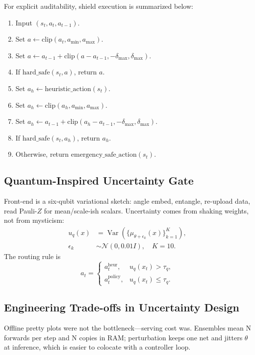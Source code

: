 For explicit auditability, shield execution is summarized below:
\begin{enumerate}
    \item Input $(s_t, a_t, a_{t-1})$.
    \item Set $a\leftarrow\mathrm{clip}(a_t,a_{\min},a_{\max})$.
    \item Set $a\leftarrow a_{t-1}+\mathrm{clip}(a-a_{t-1},-\delta_{\max},\delta_{\max})$.
    \item If $\mathrm{hard\_safe}(s_t,a)$, return $a$.
    \item Set $a_h\leftarrow\mathrm{heuristic\_action}(s_t)$.
    \item Set $a_h\leftarrow\mathrm{clip}(a_h,a_{\min},a_{\max})$.
    \item Set $a_h\leftarrow a_{t-1}+\mathrm{clip}(a_h-a_{t-1},-\delta_{\max},\delta_{\max})$.
    \item If $\mathrm{hard\_safe}(s_t,a_h)$, return $a_h$.
    \item Otherwise, return $\mathrm{emergency\_safe\_action}(s_t)$.
\end{enumerate}

\subsection{Quantum-Inspired Uncertainty Gate}

Front-end is a six-qubit variational sketch: angle embed, entangle, re-upload data, read Pauli-$Z$ for mean/scale-ish scalars. Uncertainty comes from shaking weights, not from mysticism:
\[
\begin{aligned}
u_q(x) &= \operatorname{Var}\left(\{\mu_{\theta+\epsilon_k}(x)\}_{k=1}^{K}\right), \\
\epsilon_k &\sim \mathcal{N}(0,0.01I),\quad K=10.
\end{aligned}
\]
The routing rule is
\[
a_t=
\begin{cases}
a_t^{\mathrm{heur}}, & u_q(x_t)>\tau_q,\\
a_t^{\mathrm{policy}}, & u_q(x_t)\le\tau_q.
\end{cases}
\]

\subsection{Engineering Trade-offs in Uncertainty Design}

Offline pretty plots were not the bottleneck---serving cost was. Ensembles mean N forwards per step and N copies in RAM; perturbation keeps one net and jitters $\theta$ at inference, which is easier to colocate with a controller loop.

